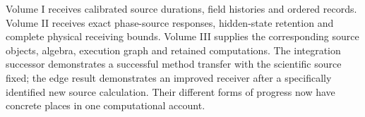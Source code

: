 Volume I receives calibrated source durations, field histories and ordered records. Volume II receives exact phase-source responses, hidden-state retention and complete physical receiving bounds. Volume III supplies the corresponding source objects, algebra, execution graph and retained computations. The integration successor demonstrates a successful method transfer with the scientific source fixed; the edge result demonstrates an improved receiver after a specifically identified new source calculation. Their different forms of progress now have concrete places in one computational account.
